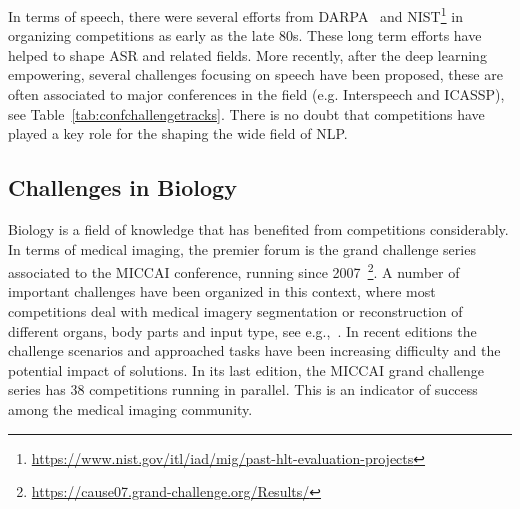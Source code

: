 \documentclass[twoside,11pt]{article}
\begin{document}
In terms of speech, there were several efforts from DARPA~\citep{marcus-1992-overview,black-eskenazi-2009-spoken} and NIST\footnote{\url{https://www.nist.gov/itl/iad/mig/past-hlt-evaluation-projects}} in organizing competitions as early as the late 80s. These long term efforts have helped to shape ASR and related fields. %
More recently, after the deep learning empowering, several challenges focusing on speech have been proposed, these are often associated to major conferences in the field (e.g. Interspeech and ICASSP), see Table~\ref{tab:confchallengetracks}. %
There is no doubt that competitions have played a key role for the shaping the wide field of NLP.



\subsection{Challenges in Biology}

Biology is a field of knowledge that has benefited from competitions considerably. In terms of medical imaging, the premier forum is the  grand challenge series associated to the MICCAI conference, running since 2007~\footnote{\url{https://cause07.grand-challenge.org/Results/}}. A number of important challenges have been organized in this context, where most competitions deal with  medical imagery segmentation or reconstruction of different organs, body parts and input type, see e.g.,~\citep{scully,Marak_Cousty_Najman_Talbot2009,10.1007/978-3-030-98253-9_1}. In recent editions the challenge scenarios and approached tasks have been increasing difficulty  and the potential impact of solutions. %
In its last edition, the MICCAI grand challenge series has 38 competitions running in parallel. This is an indicator of success among the medical imaging community.  
\end{document}
